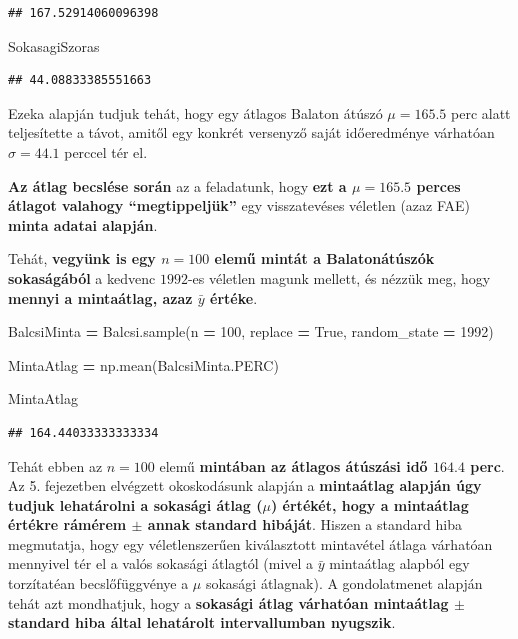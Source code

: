 \documentclass[
]{book}
\newenvironment{Shaded}{\begin{snugshade}}{\end{snugshade}}
\newcommand{\DecValTok}[1]{\textcolor[rgb]{0.00,0.00,0.81}{#1}}
\newcommand{\NormalTok}[1]{#1}
\newcommand{\OperatorTok}[1]{\textcolor[rgb]{0.81,0.36,0.00}{\textbf{#1}}}
\newcommand{\VariableTok}[1]{\textcolor[rgb]{0.00,0.00,0.00}{#1}}
\begin{document}
\begin{verbatim}
## 167.52914060096398
\end{verbatim}

\begin{Shaded}
\begin{Highlighting}[]
\NormalTok{SokasagiSzoras}
\end{Highlighting}
\end{Shaded}

\begin{verbatim}
## 44.08833385551663
\end{verbatim}

Ezeka alapján tudjuk tehát, hogy egy átlagos Balaton átúszó \(\mu=165.5\) perc alatt teljesítette a távot, amitől egy konkrét versenyző saját időeredménye várhatóan \(\sigma=44.1\) perccel tér el.

\textbf{Az átlag becslése során} az a feladatunk, hogy \textbf{ezt a \(\mu=165.5\) perces átlagot valahogy ``megtippeljük''} egy visszatevéses véletlen (azaz FAE) \textbf{minta adatai alapján}.

Tehát, \textbf{vegyünk is egy \(n=100\) elemű mintát a Balatonátúszók sokaságából} a kedvenc \(1992\)-es véletlen magunk mellett, és nézzük meg, hogy \textbf{mennyi a mintaátlag, azaz \(\bar{y}\) értéke}.

\begin{Shaded}
\begin{Highlighting}[]
\NormalTok{BalcsiMinta }\OperatorTok{=}\NormalTok{ Balcsi.sample(n }\OperatorTok{=} \DecValTok{100}\NormalTok{, replace }\OperatorTok{=} \VariableTok{True}\NormalTok{, random\_state }\OperatorTok{=} \DecValTok{1992}\NormalTok{)}

\NormalTok{MintaAtlag }\OperatorTok{=}\NormalTok{ np.mean(BalcsiMinta.PERC)}

\NormalTok{MintaAtlag}
\end{Highlighting}
\end{Shaded}

\begin{verbatim}
## 164.44033333333334
\end{verbatim}

Tehát ebben az \(n=100\) elemű \textbf{mintában az átlagos átúszási idő \(164.4\) perc}. Az 5. fejezetben elvégzett okoskodásunk alapján a \textbf{mintaátlag alapján úgy tudjuk lehatárolni a sokasági átlag (\(\mu\)) értékét, hogy a mintaátlag értékre rámérem \(\pm\) annak standard hibáját}. Hiszen a standard hiba megmutatja, hogy egy véletlenszerűen kiválasztott mintavétel átlaga várhatóan mennyivel tér el a valós sokasági átlagtól (mivel a \(\bar{y}\) mintaátlag alapból egy torzítatéan becslőfüggvénye a \(\mu\) sokasági átlagnak).
A gondolatmenet alapján tehát azt mondhatjuk, hogy a \textbf{sokasági átlag várhatóan mintaátlag \(\pm\) standard hiba által lehatárolt intervallumban nyugszik}.
\end{document}
